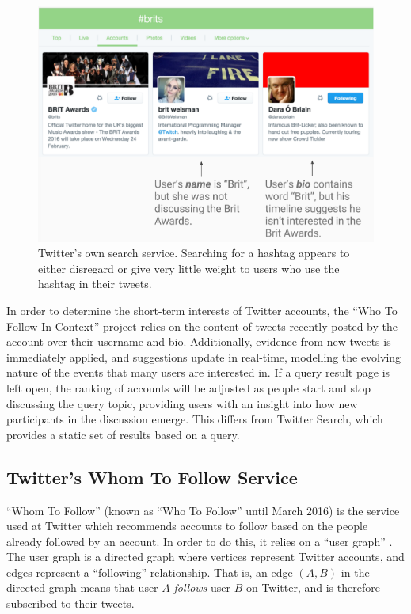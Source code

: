 \documentclass{l4proj}
\begin{document}
\begin{figure}[H]
\centering
\includegraphics[scale=0.45]{twittersearch.png}
\caption{Twitter's own search service. Searching for a hashtag appears to either disregard or give very little weight to users who use the hashtag in their tweets.}
\label{twittersearch}
\end{figure}

In order to determine the short-term interests of Twitter accounts, the ``Who To Follow In Context'' project relies on the content of tweets recently posted by the account over their username and bio. Additionally,
evidence from new tweets is immediately applied, and suggestions update in real-time, modelling the evolving nature of the events that many users are interested in. If a query result page is left open, the ranking of accounts will be adjusted as people start and stop discussing the query topic, providing users with an insight into how new participants in the discussion emerge. This differs from Twitter Search, which provides a static set of results based on a query.

\subsection{Twitter's Whom To Follow Service}
``Whom To Follow'' (known as ``Who To Follow'' until March 2016) is the service used at Twitter which recommends accounts to follow based on the people already followed by an account. In order to do this, it relies on a ``user graph'' \cite{twitterWTF}. The user graph is a directed graph where vertices represent Twitter accounts, and edges represent a ``following'' relationship. That is, an edge $(A, B)$ in the directed graph means that user $A$ \textit{follows} user $B$ on Twitter, and is therefore subscribed to their tweets. 
\end{document}
